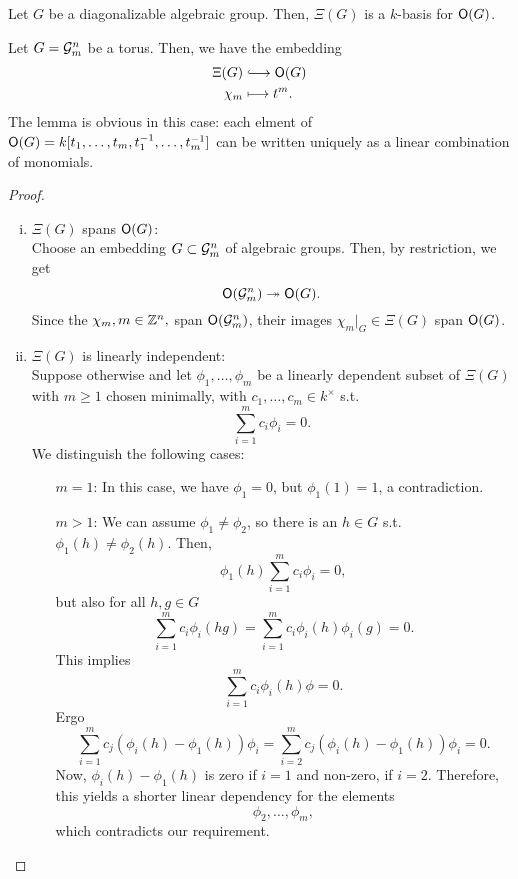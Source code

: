 \begin{lemma}
Let $G$ be a diagonalizable algebraic group. Then, $\Xi(G)$ is a $k$-basis for $\mathsf{O}(G)$.
\end{lemma}
\begin{example}
Let $G = \mathcal{G}_m^n$ be a torus. Then, we have the embedding
\begin{align*}
\Xi(G) &\Inj{} \O(G)\\
\chi_m & \longmapsto t^m.
\end{align*}
The lemma is obvious in this case: each elment of $\mathsf{O}(G) = k [t_1,\ldots, t_m, t_1^{-1}, \ldots, t_m^{-1}]$ can be written uniquely as a linear combination of monomials.
\end{example}
\begin{proof}
\begin{enumerate}[(i)]
	\item $\Xi(G)$ spans $\mathsf{O}(G)$:\\
	Choose an embedding $G \subset \mathcal{G}_m^n$ of algebraic groups. Then, by restriction, we get
	\[ \mathsf{O}(\mathcal{G}^n_m) \overset{}{\twoheadrightarrow} \mathsf{O}(G). \]
	Since the $\chi_m, m \in \mathbb{Z}^n, $ span $\mathsf{O}(\mathcal{G}_m^n)$, their images $\chi_m|_G \in \Xi(G)$ span $\mathsf{O}(G)$.
	\item $\Xi(G)$ is linearly independent:\\
	Suppose otherwise and let $\phi_1, \ldots, \phi_m$ be a linearly dependent subset of $\Xi(G)$ with $m \geq 1$ chosen minimally, with $c_1, \ldots, c_m \in k^\times$ s.t.
	\[ \sum_{i = 1}^m c_i \phi_i = 0. \]
	We distinguish the following cases:
	\begin{enumerate}
		\item[$m = 1$:] In this case, we have $\phi_1 = 0$, but $\phi_1(1) = 1$, a contradiction.
		\item[$m > 1$:] We can assume $\phi_1 \neq \phi_2$, so there is an $h \in G$ s.t. $\phi_1(h) \neq \phi_2(h)$. Then,
		\[ \phi_1(h) \sum_{i=1}^m c_i \phi_i = 0, \]
		but also for all $h,g \in G$
		\[ \sum_{i = 1}^mc_i \phi_i(hg) =\sum_{i = 1}^mc_i \phi_i(h)\phi_i(g) = 0. \]
		This implies
		\[ \sum_{i = 1}^m c_i\phi_i(h) \phi = 0. \]
		Ergo
		\[ \sum_{i= 1}^m c_j(\phi_i(h) - \phi_1(h)) \phi_i = \sum_{i= 2}^m c_j(\phi_i(h) - \phi_1(h)) \phi_i = 0. \]
		Now, $\phi_i(h) - \phi_1(h)$ is zero if $i = 1$ and non-zero, if $i = 2$. Therefore, this yields a shorter linear dependency for the elements
		\[ \phi_2, \ldots, \phi_m, \]
		which contradicts our requirement.
	\end{enumerate}
\end{enumerate}
\end{proof}

